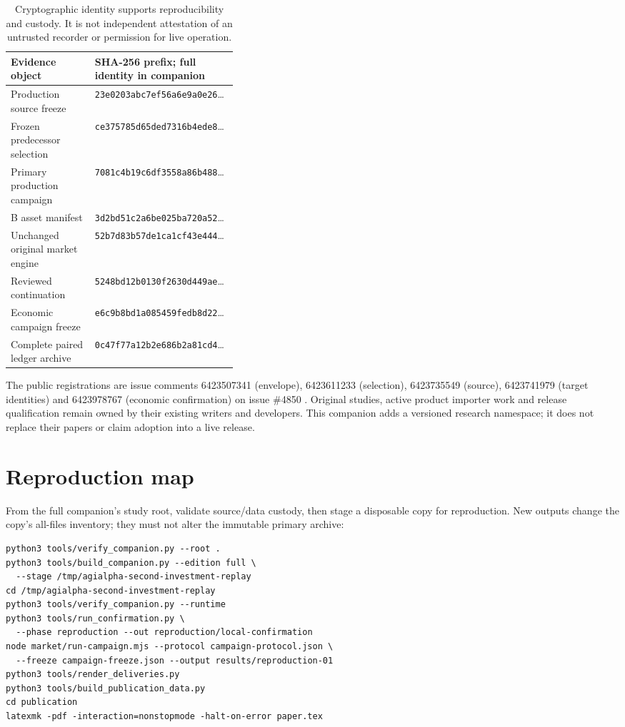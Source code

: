 \documentclass[11pt,letterpaper]{article}
\begin{document}
\begin{table}[htbp]
\centering\small
\begin{tabularx}{\linewidth}{@{}p{0.37\linewidth}Y@{}}
\toprule
Evidence object & SHA-256 prefix; full identity in companion \\
\midrule
Production source freeze & \texttt{23e0203abc7ef56a6e9a0e26}\ldots \\
Frozen predecessor selection & \texttt{ce375785d65ded7316b4ede8}\ldots \\
Primary production campaign & \texttt{7081c4b19c6df3558a86b488}\ldots \\
B asset manifest & \texttt{3d2bd51c2a6be025ba720a52}\ldots \\
Unchanged original market engine & \texttt{52b7d83b57de1ca1cf43e444}\ldots \\
Reviewed continuation & \texttt{5248bd12b0130f2630d449ae}\ldots \\
Economic campaign freeze & \texttt{e6c9b8bd1a085459fedb8d22}\ldots \\
Complete paired ledger archive & \texttt{0c47f77a12b2e686b2a81cd4}\ldots \\
\bottomrule
\end{tabularx}
\caption{Cryptographic identity supports reproducibility and custody. It is not independent attestation of an untrusted recorder or permission for live operation.}
\end{table}

The public registrations are issue comments 6423507341 (envelope), 6423611233 (selection), 6423735549 (source), 6423741979 (target identities) and 6423978767 (economic confirmation) on issue \#4850 \cite{coordination}. Original studies, active product importer work and release qualification remain owned by their existing writers and developers. This companion adds a versioned research namespace; it does not replace their papers or claim adoption into a live release.

\section{Reproduction map}

From the full companion's study root, validate source/data custody, then stage a disposable copy for reproduction. New outputs change the copy's all-files inventory; they must not alter the immutable primary archive:
\begin{verbatim}
python3 tools/verify_companion.py --root .
python3 tools/build_companion.py --edition full \
  --stage /tmp/agialpha-second-investment-replay
cd /tmp/agialpha-second-investment-replay
python3 tools/verify_companion.py --runtime
python3 tools/run_confirmation.py \
  --phase reproduction --out reproduction/local-confirmation
node market/run-campaign.mjs --protocol campaign-protocol.json \
  --freeze campaign-freeze.json --output results/reproduction-01
python3 tools/render_deliveries.py
python3 tools/build_publication_data.py
cd publication
latexmk -pdf -interaction=nonstopmode -halt-on-error paper.tex
\end{verbatim}
\end{document}
